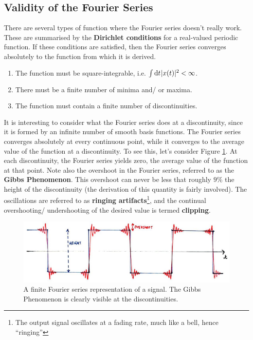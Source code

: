 \subsection{Validity of the Fourier Series}
%
There are several types of function where the Fourier series doesn't really work. These
are summarised by the \textbf{Dirichlet conditions} for a real-valued periodic function. If these
conditions are satisfied, then the Fourier series converges absolutely to the
function from which it is derived.
%
\begin{enumerate}
\item The function must be square-integrable, i.e. $\int \mathrm{d}t\mkern1mu|x(t)|^2 < \infty$.
\item There must be a finite number of minima and/ or maxima.
\item The function must contain a finite number of discontinuities.
\end{enumerate}
%
It is interesting to consider what the Fourier series does at a discontinuity,
since it is formed by an infinite number of smooth basis functions. The Fourier
series converges absolutely at every continuous point, while it converges to the
average value of the function at a discontinuity. To see this, let's consider Figure \ref{fig::lecture_4_gibbs}.
At each discontinuity, the Fourier series yields zero, the average value of the function
at that point. Note also the overshoot in the Fourier series, referred to as the \textbf{Gibbs
Phenomenon}. This overshoot can never be less that roughly $9\%$ the height of the
discontinuity (the derivation of this quantity is fairly involved). The oscillations are
referred to as \textbf{ringing artifacts}\footnote{
  The output signal oscillates at a fading rate, much like a bell, hence ``ringing''
}, and the continual overshooting/ undershooting of the desired value is termed \textbf{clipping}. 
%
\begin{figure}[H]
  \includegraphics[width=\textwidth]{images/lecture_4_gibbs.JPG}
  \caption{
    A finite Fourier series representation of a signal. The Gibbs Phenomenon
    is clearly visible at the discontinuities.
  }
  \label{fig::lecture_4_gibbs}
\end{figure}


